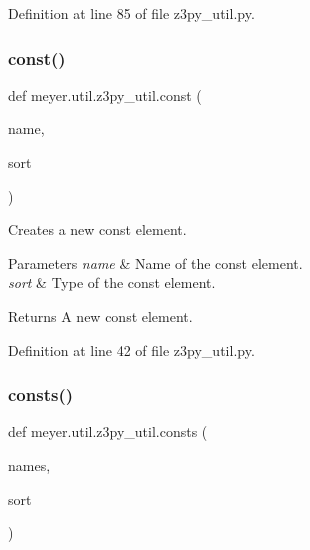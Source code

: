 Definition at line 85 of file z3py\+\_\+util.\+py.

\mbox{\label{namespacemeyer_1_1util_1_1z3py__util_a09fd9b270cf6714742578ca63a5cbb42}} 
\subsubsection{\texorpdfstring{const()}{const()}}
{\footnotesize\ttfamily def meyer.\+util.\+z3py\+\_\+util.\+const (\begin{DoxyParamCaption}\item[{}]{name,  }\item[{}]{sort }\end{DoxyParamCaption})}



Creates a new const element. 


\begin{DoxyParams}{Parameters}
{\em name} & Name of the const element. \\
\hline
{\em sort} & Type of the const element. \\
\hline
\end{DoxyParams}
\begin{DoxyReturn}{Returns}
A new const element. 
\end{DoxyReturn}


Definition at line 42 of file z3py\+\_\+util.\+py.

\mbox{\label{namespacemeyer_1_1util_1_1z3py__util_a8565362aa72ebb1f4f22eb0950d08609}} 
\subsubsection{\texorpdfstring{consts()}{consts()}}
{\footnotesize\ttfamily def meyer.\+util.\+z3py\+\_\+util.\+consts (\begin{DoxyParamCaption}\item[{}]{names,  }\item[{}]{sort }\end{DoxyParamCaption})}



